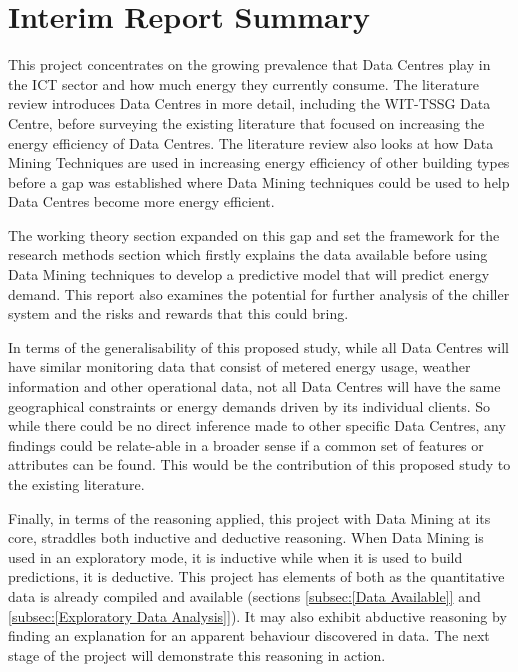 \documentclass[12pt]{scrartcl}
\begin{document}
\section{Interim Report Summary}
\label{sec:[Interim Report Summary]}
This project concentrates on the growing prevalence that Data Centres play in the ICT sector and how much energy they currently consume. The literature review introduces Data Centres in more detail, including the WIT-TSSG Data Centre, before surveying the existing literature that focused on increasing the energy efficiency of Data Centres.  The literature review also looks at how Data Mining Techniques are used in increasing energy efficiency of other building types before a gap was established where Data Mining techniques could be used to help Data Centres become more energy efficient. 

The working theory section expanded on this gap and set the framework for the research methods section which firstly explains the data available before using Data Mining techniques  to develop a predictive model that will predict energy demand. This report also examines the potential for further analysis of the chiller system and the risks and rewards that this could bring.  

In terms of the generalisability of this proposed study, while all Data Centres will have similar monitoring data that consist of metered energy usage, weather information and other operational data, not all Data Centres will have the same geographical constraints or energy demands driven by its individual clients. So while there could be no direct inference made to other specific Data Centres, any findings could be relate-able in a broader sense if a common set of features or attributes can be found. This would be the contribution of this proposed study to the existing literature.    

Finally, in terms of the reasoning applied, this project with Data Mining at its core, straddles both inductive and deductive reasoning. When Data Mining is used in an exploratory mode, it is inductive while when it is used to build predictions, it is deductive. This project has elements of both as the quantitative data is already compiled and available (sections \ref{subsec:[Data Available]} and \ref{subsec:[Exploratory Data Analysis]}). It may also exhibit abductive reasoning by finding an explanation for an apparent behaviour discovered in data. The next stage of the project will demonstrate this reasoning in action.

\newpage
\printbibliography[heading=bibintoc]
\newpage
\printglossary
\newpage
\appendix
\appendixpage
\addappheadtotoc
\end{document}

